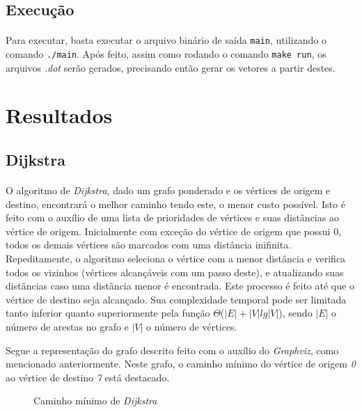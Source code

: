 \documentclass{article}
\begin{document}
			\subsection{Execução}
				\paragraph{} Para executar, basta executar o arquivo binário de saída \texttt{main}, utilizando o comando \texttt{./main}. Após feito, assim como rodando o comando \texttt{make run}, os arquivos {\it .dot} serão gerados, precisando então gerar os vetores a partir destes.

		\section{Resultados}
			\subsection{Dijkstra}
				\paragraph{} O algoritmo de {\it Dijkstra}, dado um grafo ponderado e os vértices de origem e destino, encontrará o melhor caminho tendo este, o menor custo possível. Isto é feito com o auxílio de uma lista de prioridades de vértices e suas distâncias ao vértice de origem. Inicialmente com exceção do vértice de origem que possui 0, todos os demais vértices são marcados com uma distância inifinita. Repeditamente, o algoritmo seleciona o vértice com a menor distância e verifica todos os vizinhos (vértices alcançáveis com um passo deste), e atualizando suas distâncias caso uma distância menor é encontrada. Este processo é feito até que o vértice de destino seja alcançado. Sua complexidade temporal pode ser limitada tanto inferior quanto superiormente pela função $\Theta$($|E| + |V|lg|V|$), sendo $|E|$ o número de arestas no grafo e $|V|$ o número de vértices.
				\par{} Segue a representação do grafo descrito feito com o auxílio do {\it Graphviz}, como mencionado anteriormente. Neste grafo, o caminho mínimo do vértice de origem {\it 0} ao vértice de destino {\it 7} está destacado.
				\begin{figure}[H]
					\centering
					
					\caption{Caminho mínimo de {\it Dijkstra}}
					\label{fig:dijkstra}
				\end{figure}
\end{document}
